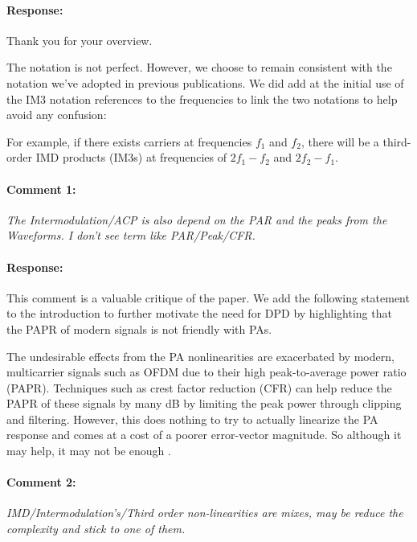 \documentclass[]{article}
\begin{document}
\paragraph{Response:}
Thank you for your overview. 

The notation is not perfect. However, we choose to remain consistent with the notation we've adopted in previous publications. We did add at the initial use of the IM3 notation references to the frequencies to link the two notations to help avoid any confusion:

{\color{red} For example, if there exists carriers at frequencies $f_1$ and $f_2$, there will be a third-order IMD products (IM3s) at frequencies of $2f_1 - f_2$ and $2f_2 - f_1$.}



\paragraph{Comment 1:}\textit{The Intermodulation/ACP is also depend on the PAR and the peaks from the Waveforms. I don't see term like PAR/Peak/CFR.}

\paragraph{Response:}
This comment is a valuable critique of the paper. We add the following statement to the introduction to further motivate the need for DPD by highlighting that the PAPR of modern signals is not friendly with PAs. 
 
{\color{red} The undesirable effects from the PA nonlinearities are exacerbated by modern, multicarrier signals such as OFDM due to their high peak-to-average power ratio (PAPR). Techniques such as crest factor reduction (CFR) can help reduce the PAPR of these signals by many dB by limiting the peak power through clipping and filtering. However, this does nothing to try to actually linearize the PA response and comes at a cost of a poorer error-vector magnitude. So although it may help, it may not be enough .} 

\paragraph{Comment 2:}\textit{IMD/Intermodulation's/Third order non-linearities are mixes, may be reduce the complexity and stick to one of them.}
\end{document}
